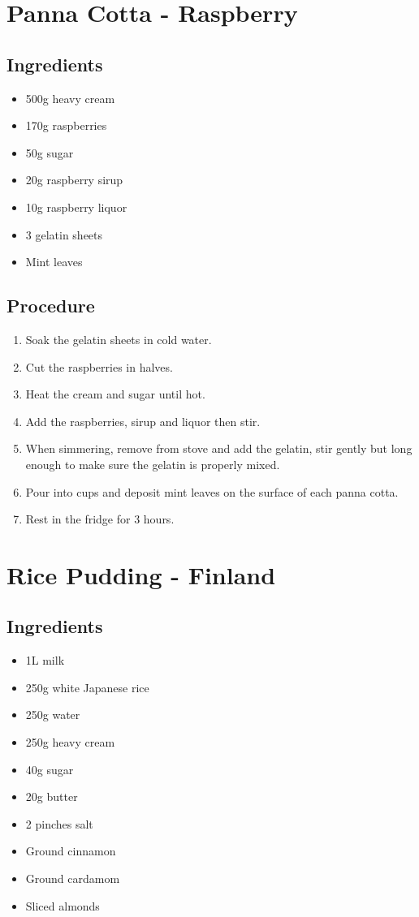 \documentclass[10pt]{book}
\begin{document}

\newpage
\section*{Panna Cotta - Raspberry}
\subsection*{Ingredients}
	\begin{itemize}
		\item 500g heavy cream
		\item 170g raspberries
		\item 50g sugar
		\item 20g raspberry sirup
		\item 10g raspberry liquor
		\item 3 gelatin sheets
		\item Mint leaves
	\end{itemize}
\subsection*{Procedure}
	\begin{enumerate}
		\item Soak the gelatin sheets in cold water.
		\item Cut the raspberries in halves.
		\item Heat the cream and sugar until hot.
		\item Add the raspberries, sirup and liquor then stir.
		\item When simmering, remove from stove and add the gelatin, stir gently but long enough to make sure the gelatin is properly mixed.
		\item Pour into cups and deposit mint leaves on the surface of each panna cotta.
		\item Rest in the fridge for 3 hours.
	\end{enumerate}
\newpage


\newpage
\section*{Rice Pudding - Finland}
\subsection*{Ingredients}
	\begin{itemize}
		\item 1L milk
		\item 250g white Japanese rice
		\item 250g water
		\item 250g heavy cream
		\item 40g sugar
		\item 20g butter
		\item 2 pinches salt
		\item Ground cinnamon
		\item Ground cardamom
		\item Sliced almonds
	\end{itemize}
\end{document}
